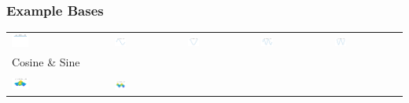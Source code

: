 \documentclass[11pt,compress,xcolor={usenames,dvipsnames},aspectratio=169]{beamer}
\begin{document}
\begin{frame}
\frametitle{Example Bases}
\vspace{-3ex}
	\begin{tabular}{>{\centering}m{}>{\centering}m{}>{\centering}m{}>{\centering}m{}>{\centering}m{}}
		\includegraphics[width =0.18\textwidth]{ProgramsImages/CosineSine_Degree_0.png}  &
		\includegraphics[width =0.18\textwidth]{ProgramsImages/CosineSine_Degree_1.png}  &
		\includegraphics[width =0.18\textwidth]{ProgramsImages/CosineSine_Degree_2.png}  &
		\includegraphics[width =0.18\textwidth]{ProgramsImages/CosineSine_Degree_3.png}  &
		\includegraphics[width =0.18\textwidth]{ProgramsImages/CosineSine_Degree_4.png} 
	\tabularnewline[-7ex]
	Cosine \& Sine
	\tabularnewline
	\tabularnewline
		\includegraphics[width =0.18\textwidth]{ProgramsImages/CosineSine_Degree_1_1.png}  &
\includegraphics[width =0.18\textwidth]{ProgramsImages/CosineSine_Degree_1_2.png}  &

\end{tabular}
\end{frame}
\end{document}
